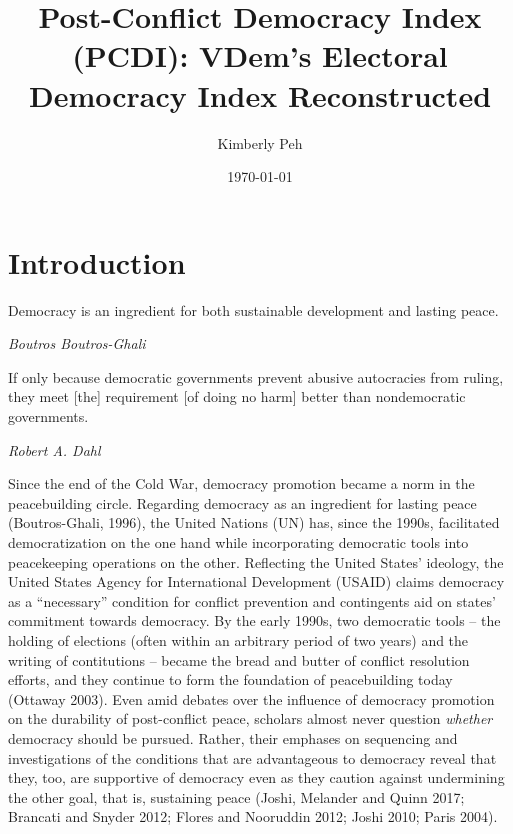 \documentclass [11pt]{article}
\title{Post-Conflict Democracy Index (PCDI): VDem's Electoral Democracy Index Reconstructed}
\author{Kimberly Peh}
\date{\today}
\begin{document}
\maketitle

\section*{Introduction} 

\epigraph{Democracy is an ingredient for both sustainable development and lasting peace.}{\emph{Boutros Boutros-Ghali}}
\epigraph{If only because democratic governments prevent abusive autocracies from ruling, they meet [the] requirement [of doing no harm] better than nondemocratic governments.}{\emph{Robert A. Dahl}}

Since the end of the Cold War, democracy promotion became a norm in the peacebuilding circle. Regarding democracy as an ingredient for lasting peace (Boutros-Ghali, 1996), the United Nations (UN) has, since the 1990s, facilitated democratization on the one hand while incorporating democratic tools into peacekeeping operations on the other. Reflecting the United States' ideology, the United States Agency for International Development (USAID) claims democracy as a ``necessary'' condition for conflict prevention and contingents aid on states' commitment towards democracy. By the early 1990s, two democratic tools -- the holding of elections (often within an arbitrary period of two years) and the writing of contitutions -- became the bread and butter of conflict resolution efforts, and they continue to form the foundation of peacebuilding today (Ottaway 2003). Even amid debates over the influence of democracy promotion on the durability of post-conflict peace, scholars almost never question \emph{whether} democracy should be pursued. Rather, their emphases on sequencing and investigations of the conditions that are advantageous to democracy reveal that they, too, are supportive of democracy even as they caution against undermining the other goal, that is, sustaining peace (Joshi, Melander and Quinn 2017; Brancati and Snyder 2012; Flores and Nooruddin 2012; Joshi 2010; Paris 2004).
\end{document}
